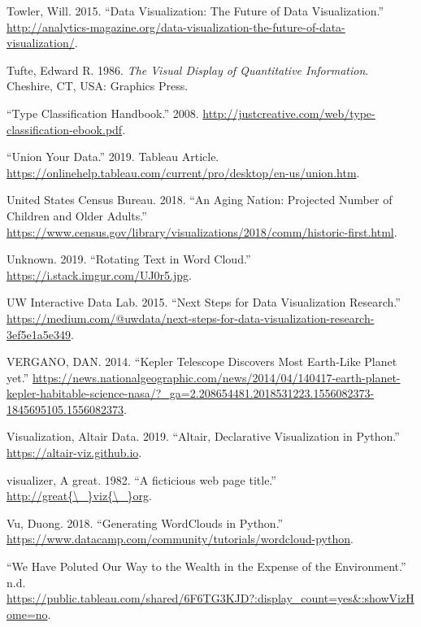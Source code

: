\documentclass[]{book}
\begin{document}
\leavevmode\hypertarget{ref-future_viz}{}%
Towler, Will. 2015. ``Data Visualization: The Future of Data Visualization.'' \url{http://analytics-magazine.org/data-visualization-the-future-of-data-visualization/}.

\leavevmode\hypertarget{ref-The-Visual-Display-of-Quantitative-Information}{}%
Tufte, Edward R. 1986. \emph{The Visual Display of Quantitative Information}. Cheshire, CT, USA: Graphics Press.

\leavevmode\hypertarget{ref-type_class}{}%
``Type Classification Handbook.'' 2008. \url{http://justcreative.com/web/type-classification-ebook.pdf}.

\leavevmode\hypertarget{ref-Tableau_Union}{}%
``Union Your Data.'' 2019. Tableau Article. \url{https://onlinehelp.tableau.com/current/pro/desktop/en-us/union.htm}.

\leavevmode\hypertarget{ref-aging_nation}{}%
United States Census Bureau. 2018. ``An Aging Nation: Projected Number of Children and Older Adults.'' \url{https://www.census.gov/library/visualizations/2018/comm/historic-first.html}.

\leavevmode\hypertarget{ref-wordCloudimage}{}%
Unknown. 2019. ``Rotating Text in Word Cloud.'' \url{https://i.stack.imgur.com/UJ0r5.jpg}.

\leavevmode\hypertarget{ref-Next_Steps}{}%
UW Interactive Data Lab. 2015. ``Next Steps for Data Visualization Research.'' \url{https://medium.com/@uwdata/next-steps-for-data-visualization-research-3ef5e1a5e349}.

\leavevmode\hypertarget{ref-Dan}{}%
VERGANO, DAN. 2014. ``Kepler Telescope Discovers Most Earth-Like Planet yet.'' \url{https://news.nationalgeographic.com/news/2014/04/140417-earth-planet-kepler-habitable-science-nasa/?_ga=2.208654481.2018531223.1556082373-1845695105.1556082373}.

\leavevmode\hypertarget{ref-Altair}{}%
Visualization, Altair Data. 2019. ``Altair, Declarative Visualization in Python.'' \url{https://altair-viz.github.io}.

\leavevmode\hypertarget{ref-great_viz}{}%
visualizer, A great. 1982. ``A ficticious web page title.'' \href{http://great\%7B/_\%7Dviz\%7B/_\%7Dorg}{http://great\{\textbackslash{}\_\}viz\{\textbackslash{}\_\}org}.

\leavevmode\hypertarget{ref-python_wordcloud}{}%
Vu, Duong. 2018. ``Generating WordClouds in Python.'' \url{https://www.datacamp.com/community/tutorials/wordcloud-python}.

\leavevmode\hypertarget{ref-Yale_Climate_Opinion}{}%
``We Have Poluted Our Way to the Wealth in the Expense of the Environment.'' n.d. \url{https://public.tableau.com/shared/6F6TG3KJD?:display_count=yes\&:showVizHome=no}.
\end{document}
